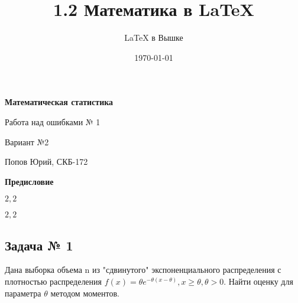 \documentclass[a4paper,12pt, oneside]{book}
\author{\LaTeX{} в Вышке}
\title{1.2 Математика в \LaTeX}
\date{\today}
\begin{document}
	\pagestyle{plain}
	
	\begin{titlepage}	
		\begin{center}
			{\Huge \textbf{Математическая статистика}}
			\vspace{30mm}
			
			{\Huge Работа над ошибками  № 1 \\}
			\vspace{30mm}
			
			{\huge Вариант №2}
			\vspace{30mm}
			
			{\Large Попов Юрий, СКБ-172}
		\end{center}
	\end{titlepage}
	
	
\begin{spacing}{0.99}          
	\tableofcontents               
\end{spacing}
\setcounter{secnumdepth}{-1} %



\newpage
\begin{center}
	{\Huge{\bf{Предисловие}}}
\end{center}

$2,2$

$2, 2$


\begin{center}
	\chapter{Задача № 1}
\end{center}

Дана выборка объема n из "сдвинутого"$  $  экспоненциального распределения с плотностью распределения $ f(x) = \theta e^{-\theta(x-\theta)} , x \geq \theta, \theta > 0.$ Найти оценку для параметра $ \theta $ методом моментов.\\
\end{document}
